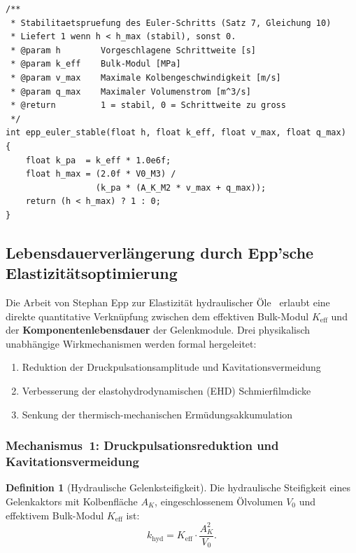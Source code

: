 ﻿\documentclass[a4paper,12pt]{scrreprt}
\theoremstyle{definition}
\newtheorem{definition}{Definition}[section]
\begin{document}
\begin{lstlisting}
/**
 * Stabilitaetspruefung des Euler-Schritts (Satz 7, Gleichung 10)
 * Liefert 1 wenn h < h_max (stabil), sonst 0.
 * @param h        Vorgeschlagene Schrittweite [s]
 * @param k_eff    Bulk-Modul [MPa]
 * @param v_max    Maximale Kolbengeschwindigkeit [m/s]
 * @param q_max    Maximaler Volumenstrom [m^3/s]
 * @return         1 = stabil, 0 = Schrittweite zu gross
 */
int epp_euler_stable(float h, float k_eff, float v_max, float q_max)
{
    float k_pa  = k_eff * 1.0e6f;
    float h_max = (2.0f * V0_M3) /
                  (k_pa * (A_K_M2 * v_max + q_max));
    return (h < h_max) ? 1 : 0;
}
\end{lstlisting}

\subsection{Lebensdauerverlängerung durch Epp'sche Elastizitätsoptimierung}

Die Arbeit von Stephan Epp zur Elastizität hydraulischer Öle~\cite{hydr2026}
erlaubt eine direkte quantitative Verknüpfung zwischen dem effektiven
Bulk-Modul $K_{\text{eff}}$ und der \textbf{Komponentenlebensdauer}
der Gelenkmodule. Drei physikalisch unabhängige Wirkmechanismen werden
formal hergeleitet:

\begin{enumerate}
  \item Reduktion der Druckpulsationsamplitude und Kavitationsvermeidung
  \item Verbesserung der elastohydrodynamischen (EHD) Schmierfilmdicke
  \item Senkung der thermisch-mechanischen Ermüdungsakkumulation
\end{enumerate}

\subsubsection{Mechanismus~1: Druckpulsationsreduktion und Kavitationsvermeidung}

\begin{definition}[Hydraulische Gelenksteifigkeit]
\label{def:hyd_steif}
Die hydraulische Steifigkeit eines Gelenkaktors mit Kolbenfläche $A_K$,
eingeschlossenem Ölvolumen $V_0$ und effektivem Bulk-Modul $K_{\text{eff}}$ ist:
\begin{equation}
  k_{\text{hyd}} = K_{\text{eff}} \cdot \frac{A_K^2}{V_0}.
  \label{eq:khyd}
\end{equation}
\end{definition}
\end{document}
